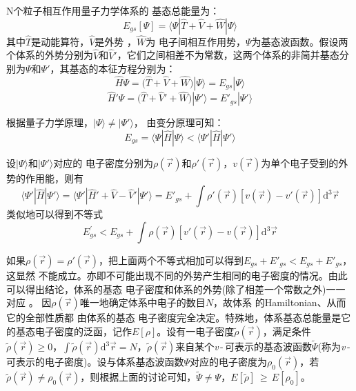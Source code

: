 N个粒子相互作用量子力学体系的%
{基态总能量}为：
$${E_{gs}[\Psi]}%
=\langle\Psi%
|\hat{T}+\hat{V}+\hat{W}|\Psi%
\rangle$$
其中$\hat{T}$是动能算符，$\hat{V}$是外势%
，$\hat{W}$为%
{电}子间相互作用势{，$\Psi$为基态波函数}。假设两个体系的外势分别为$\hat{V}$和$\hat V'$，它们之间相差不为常数，这两个体系的非简并基态分别为$\Psi$和$\Psi'$，其基态的本征方程分别为：
$${\hat H\Psi=}\bigl(\hat{T}+\hat{V}+\hat{W}\bigr)|\Psi\rangle=E_{gs}|\Psi\rangle$$
$${\hat H'\Psi=}\bigl(\hat{T}+\hat V'+\hat{W}\bigr)|\Psi'\rangle=E'_{gs}|\Psi'\rangle$$

{根据量子力学原理，}$|\Psi\rangle{\neq}|\Psi'\rangle$，%
由变分原理可知：
$$E_{gs}=\langle\Psi|\hat{H}|\Psi\rangle<\langle\Psi'|\hat{H}|\Psi'\rangle$$

设$|\Psi\rangle$和$|\Psi'\rangle$对应的%
{电}子密度分别为$\rho(\vec{r})
$和$\rho'(\vec{r})$，{$v(\vec r)$为单个电子受到的外势的作用能，则}有
$$\langle\Psi'|\hat{H}|\Psi'\rangle=\langle\Psi'|\hat H'+\hat{V}-\hat V'|\Psi'\rangle=E'_{gs}+\int{\rho'(\vec{r})[v(\vec{r})-v'(\vec{r})]\textrm{d}^3\vec{r}}$$
{类似地}可以得到不等式
$$E^{'}_{gs}<E_{gs}+\int{\rho(\vec{r})[v'(\vec{r})-v(\vec{r})]\textrm{d}^{3}\vec{r}}$$

{如果}$\rho(\vec{r})\!=\!\rho'(\vec{r})$，把上面两个不等式相加可以得到$E_{gs}+E'_{gs}\!<\!E_{gs}+E'_{gs}$，这显然%
{不能成立。亦即不可能出现不同的外势产生相同的电子密度的情况}。由此可以得出结论，体系的基态%
{电}子密度和体系的外势(除了相差一个常数之外)一一对应%
{。}%
{因$\rho(\vec r)$唯一地确定体系中电子的数目$N$，故}体系%
{%
的\textrm{Hamiltonian}、从而它的全部}性质都%
由体系的基态%
{电}子密度完全决定。{特殊地，体系基态总能量是它的基态电子密度的泛函，记作$E[\rho]$。设有一电子密度$\tilde\rho(\vec r)$，满足条件$\tilde\rho(\vec r)\!\geqslant\!0$，$\displaystyle\int\tilde\rho(\vec r)\textrm{d}^3\vec r\!=\!N$，$\tilde\rho(\vec r)$来自某个\textit{v}\,-\,可表示的基态波函数$\tilde\Psi$(称为\textit{v}\,-\,可表示的电子密度)。设与体系基态波函数$\Psi$对应的电子密度为$\rho_0(\vec r)$，若$\tilde\rho(\vec r)\!\neq\!\rho_0(\vec r)$，则根据上面的讨论可知，$\tilde\Psi\!\neq\!\Psi$，$E[\tilde\rho]$\,$\geqslant$\,$E[\rho_0]$。}

